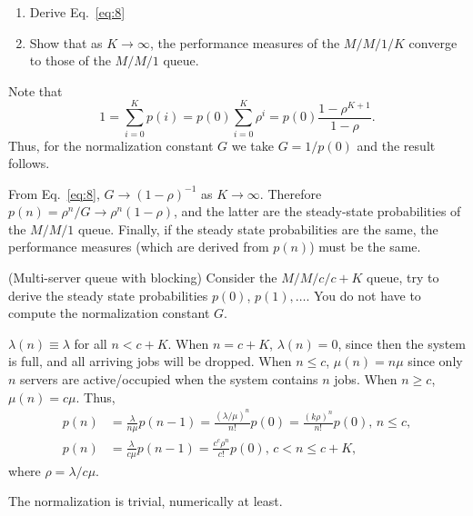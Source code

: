 \begin{question}
  \begin{enumerate}
  \item Derive Eq.~\eqref{eq:8}
  \item   Show that as $K\to\infty$, the performance measures of the $M/M/1/K$ converge to those of the $M/M/1$ queue. 
  \end{enumerate}
  \begin{solution}
Note that 
\begin{equation*}
1 = \sum_{i=0}^K p(i) = p(0)\sum_{i=0}^K \rho^i  = p(0) \frac{1-\rho^{K+1}}{1-\rho}. 
\end{equation*}
Thus, for the normalization constant $G$ we take $G=1/p(0)$ and the result follows. 

    From Eq.~\eqref{eq:8}, $G\to (1-\rho)^{-1}$ as $K\to \infty$.
    Therefore $p(n)=\rho^n/G \to \rho^n(1-\rho)$, and the latter are
    the steady-state probabilities of the $M/M/1$ queue. Finally, if
    the steady state probabilities are the same, the performance
    measures (which are derived from $p(n)$) must be the same.
  \end{solution}
\end{question}

\begin{question}(Multi-server queue with blocking) Consider the
  $M/M/c/c+K$ queue, try to derive the steady state probabilities
  $p(0)$, $p(1), \ldots$. You do not have to compute the normalization
  constant $G$.


  \begin{solution}
    $\lambda(n) \equiv \lambda$ for all $n<c+K$. When $n=c+K$,
    $\lambda(n)=0$, since then the system is full, and all arriving
    jobs will be dropped.  When $n\leq c$, $\mu(n)=n \mu$ since only
    $n$ servers are active/occupied when the system contains $n$
    jobs. When $n\geq c$, $\mu(n) = c \mu$. Thus,
    \begin{align*}
      p(n) &= \frac{\lambda}{n\mu} p(n-1) = \frac{(\lambda/\mu)^n}{n!} p(0)=\frac{(k\rho)^n}{n!}p(0), \, n\leq c, \\
      p(n) &= \frac{\lambda}{c\mu} p(n-1) = \frac{c^c \rho^n}{c!} p(0), \, c<n\leq c+K,
    \end{align*}
where $\rho = \lambda/c \mu$.  

The normalization is trivial, numerically at least.
  \end{solution}
\end{question}


